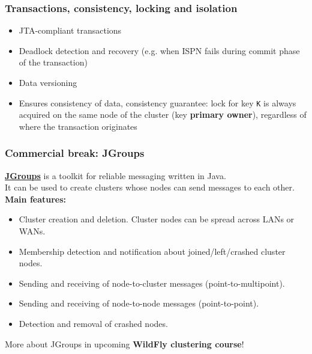 \documentclass[10pt,utf8]{beamer}
\begin{document}
\begin{frame}
	\frametitle{Transactions, consistency, locking and isolation}
	\begin{itemize}
		\item JTA-compliant transactions
		\pause
		\item Deadlock detection and recovery (e.g. when ISPN fails during commit phase of the transaction)
		\pause
		\item Data versioning
		\pause
		\item Ensures consistency of data, consistency guarantee: 
		lock for key \texttt{K} is always acquired on the same node of the cluster (key \textbf{primary owner}), regardless of where the transaction originates
	\end{itemize}
\end{frame}


\begin{frame}
	\frametitle{Commercial break: JGroups}
	\href{http://jgroups.org/}{\color{blue}\textbf{JGroups}} is a toolkit for reliable messaging written in Java. \\
	It can be used to create clusters whose nodes can send messages to each other.\\
	\vspace{0.5cm}
	\textbf{Main features:}
	\begin{itemize}
		\pause
		\item Cluster creation and deletion. Cluster nodes can be spread across LANs or WANs.
		\pause
		\item Membership detection and notification about joined/left/crashed cluster nodes.
		\pause
		\item Sending and receiving of node-to-cluster messages (point-to-multipoint).
		\pause
		\item Sending and receiving of node-to-node messages (point-to-point).
		\pause
		\item Detection and removal of crashed nodes.
	\end{itemize}
	More about JGroups in upcoming \textbf{WildFly clustering course}!
\end{frame}
\end{document}

